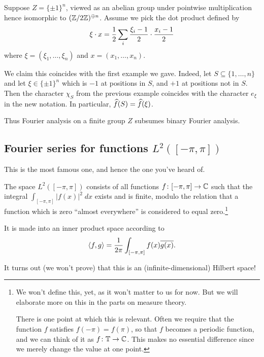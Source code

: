 \begin{example}
	Suppose $Z = \{\pm 1\}^n$, viewed as an abelian group
	under pointwise multiplication
	hence isomorphic to $(\mathbb Z/2\mathbb Z)^{\oplus n}$.
	Assume we pick the dot product defined by
	\[ \xi \cdot x = \frac{1}{2} \sum_i \frac{\xi_i-1}{2} \cdot \frac{x_i-1}{2} \]
	where $\xi = (\xi_1, \dots, \xi_n)$ and $x = (x_1, \dots, x_n)$.

	We claim this coincides with the first example we gave.
	Indeed, let $S \subseteq \{1, \dots, n\}$
	and let $\xi \in \{\pm1\}^n$ which is $-1$ at positions in $S$,
	and $+1$ at positions not in $S$.
	Then the character $\chi_S$ from the previous example
	coincides with the character $e_\xi$ in the new notation.
	In particular, $\widehat f(S) = \widehat f(\xi)$.

	Thus Fourier analysis on a finite group $Z$ subsumes
	binary Fourier analysis.
\end{example}

\subsection{Fourier series for functions $L^2([-\pi, \pi])$}
This is the most famous one, and hence the one you've heard of.
\begin{definition}
	The space $L^2([-\pi, \pi])$ consists of all functions
	$f \colon [-\pi, \pi] \to \mathbb C$ such that
	the integral
	$\int_{[-\pi, \pi]} \left\lvert f(x) \right\rvert^2 \; dx$
	exists and is finite,
	modulo the relation that a function which is zero ``almost everywhere''
	is considered to equal zero.\footnote{We won't define this, yet,
		as it won't matter to us for now.
		But we will elaborate more on this in the parts on measure theory.
	
		There is one point at which this is relevant.
		Often we require that the function $f$ satisfies $f(-\pi) = f(\pi)$,
		so that $f$ becomes a periodic function,
		and we can think of it as $f \colon \mathbb T \to \mathbb C$.
		This makes no essential difference
		since we merely change the value at one point.}

	It is made into an inner product space according to
	\[ \left< f,g \right>
		= \frac{1}{2\pi} \int_{[-\pi, \pi]} f(x) \overline{g(x)}. \]
\end{definition}
It turns out (we won't prove) that this is an
(infinite-dimensional) Hilbert space!

